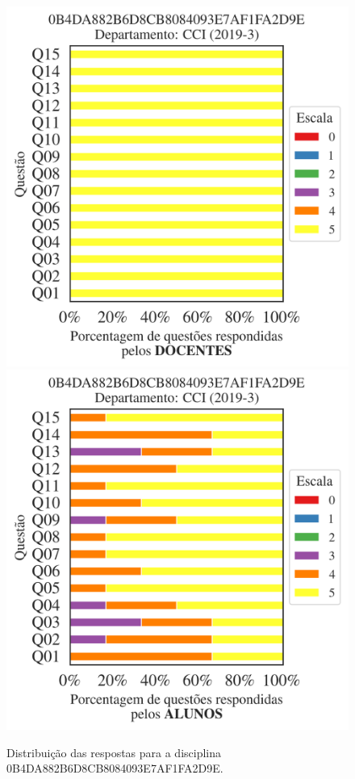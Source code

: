 \documentclass[a4paper,10pt]{article}
\begin{document}
\begin{figure}[h]
\centering
\includegraphics[width=0.485\linewidth]{analise_disciplina_departamento_CCI_0B4DA882B6D8CB8084093E7AF1FA2D9E_docentes.png}
\includegraphics[width=0.485\linewidth]{analise_disciplina_departamento_CCI_0B4DA882B6D8CB8084093E7AF1FA2D9E_alunos.png}
\caption{\label{fig:analise_geral_departamento}                Distribuição das respostas para a disciplina 0B4DA882B6D8CB8084093E7AF1FA2D9E. }
\end{figure}
\end{document}
